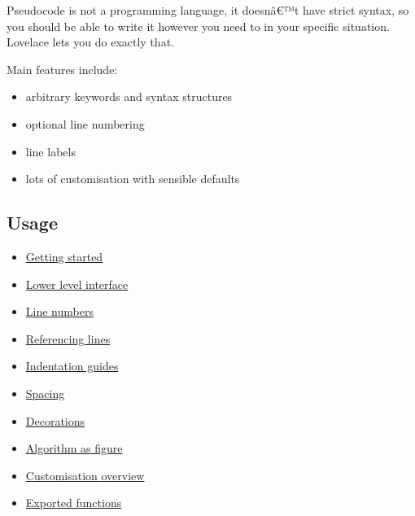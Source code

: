 Pseudocode is not a programming language, it doesnâ€™t have strict
syntax, so you should be able to write it however you need to in your
specific situation. Lovelace lets you do exactly that.

Main features include:

\begin{itemize}
\tightlist
\item
  arbitrary keywords and syntax structures
\item
  optional line numbering
\item
  line labels
\item
  lots of customisation with sensible defaults
\end{itemize}

\subsection{Usage}\label{usage}

\begin{itemize}
\tightlist
\item
  \href{https://github.com/typst/packages/raw/main/packages/preview/lovelace/0.3.0/\#getting-started}{Getting
  started}
\item
  \href{https://github.com/typst/packages/raw/main/packages/preview/lovelace/0.3.0/\#lower-level-interface}{Lower
  level interface}
\item
  \href{https://github.com/typst/packages/raw/main/packages/preview/lovelace/0.3.0/\#line-numbers}{Line
  numbers}
\item
  \href{https://github.com/typst/packages/raw/main/packages/preview/lovelace/0.3.0/\#referencing-lines}{Referencing
  lines}
\item
  \href{https://github.com/typst/packages/raw/main/packages/preview/lovelace/0.3.0/\#indentation-guides}{Indentation
  guides}
\item
  \href{https://github.com/typst/packages/raw/main/packages/preview/lovelace/0.3.0/\#spacing}{Spacing}
\item
  \href{https://github.com/typst/packages/raw/main/packages/preview/lovelace/0.3.0/\#decorations}{Decorations}
\item
  \href{https://github.com/typst/packages/raw/main/packages/preview/lovelace/0.3.0/\#algorithm-as-figure}{Algorithm
  as figure}
\item
  \href{https://github.com/typst/packages/raw/main/packages/preview/lovelace/0.3.0/\#customisation-overview}{Customisation
  overview}
\item
  \href{https://github.com/typst/packages/raw/main/packages/preview/lovelace/0.3.0/\#exported-functions}{Exported
  functions}
\end{itemize}

